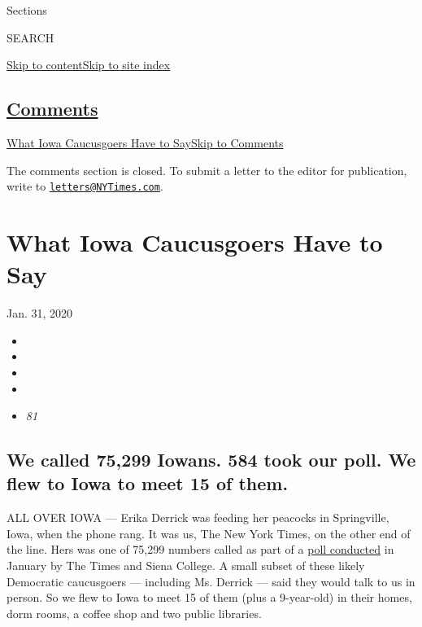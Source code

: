 Sections

SEARCH

\protect\hyperlink{site-content}{Skip to
content}\protect\hyperlink{site-index}{Skip to site index}

\hypertarget{comments}{%
\subsection{\texorpdfstring{\protect\hyperlink{commentsContainer}{Comments}}{Comments}}\label{comments}}

\href{}{What Iowa Caucusgoers Have to Say}\href{}{Skip to Comments}

The comments section is closed. To submit a letter to the editor for
publication, write to
\href{mailto:letters@NYTimes.com}{\nolinkurl{letters@NYTimes.com}}.

\hypertarget{what-iowa-caucusgoers-have-to-say}{%
\section{What Iowa Caucusgoers Have to
Say}\label{what-iowa-caucusgoers-have-to-say}}

Jan. 31, 2020

\begin{itemize}
\item
\item
\item
\item
\item
  \emph{81}
\end{itemize}

\hypertarget{we-called--75299-iowans-584-took-our-poll-we-flew--to-iowa-to-meet-15-of-them}{%
\subsection{\texorpdfstring{We called 75,299 Iowans. 584 took our poll.
We flew to Iowa to meet 15 of
them.}{We called  75,299 Iowans. 584 took our poll. We flew  to Iowa to meet 15 of them.}}\label{we-called--75299-iowans-584-took-our-poll-we-flew--to-iowa-to-meet-15-of-them}}

ALL OVER IOWA --- Erika Derrick was feeding her peacocks in Springville,
Iowa, when the phone rang. It was us, The New York Times, on the other
end of the line. Hers was one of 75,299 numbers called as part of a
\href{https://www.nytimes3xbfgragh.onion/2020/01/25/us/politics/democratic-iowa-poll-sanders.html}{poll
conducted} in January by The Times and Siena College. A small subset of
these likely Democratic caucusgoers --- including Ms. Derrick --- said
they would talk to us in person. So we flew to Iowa to meet 15 of them
(plus a 9-year-old) in their homes, dorm rooms, a coffee shop and two
public libraries.

